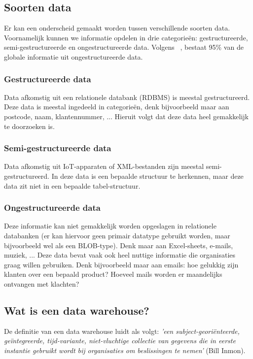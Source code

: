 \subsection{Soorten data}
Er kan een onderscheid gemaakt worden tussen verschillende soorten data. Voornamelijk kunnen we informatie opdelen in drie categorieën: gestructureerde, semi-gestructureerde en ongestructureerde data. Volgens  ~\textcite{Langseth2005}, bestaat 95\% van de globale informatie uit ongestructureerde data. 

\subsubsection{Gestructureerde data}
Data afkomstig uit een relationele databank (RDBMS) is meestal gestructureerd. Deze data is meestal ingedeeld in categorieën, denk bijvoorbeeld maar aan postcode, naam, klantennummer, ... Hieruit volgt dat deze data heel gemakkelijk te doorzoeken is. 

\subsubsection{Semi-gestructureerde data}
Data afkomstig uit IoT-apparaten of XML-bestanden zijn meestal semi-gestructureerd. In deze data is een bepaalde structuur te herkennen, maar deze data zit niet in een bepaalde tabel-structuur.

\subsubsection{Ongestructureerde data}
Deze informatie kan niet gemakkelijk worden opgeslagen in relationele databanken (er kan hiervoor geen primair datatype gebruikt worden, maar bijvoorbeeld wel als een BLOB-type). Denk maar aan Excel-sheets, e-mails, muziek, ... Deze data bevat vaak ook heel nuttige informatie die organisaties graag willen gebruiken. Denk bijvoorbeeld maar aan emails: hoe gelukkig zijn klanten over een bepaald product? Hoeveel mails worden er maandelijks ontvangen met klachten?

\subsection{Wat is een data warehouse?}
De definitie van een data warehouse luidt als volgt: \textit{'een subject-georiënteerde, geïntegreerde, tijd-variante, niet-vluchtige collectie van gegevens die in eerste instantie gebruikt wordt bij organisaties om beslissingen te nemen'} (Bill Inmon).

